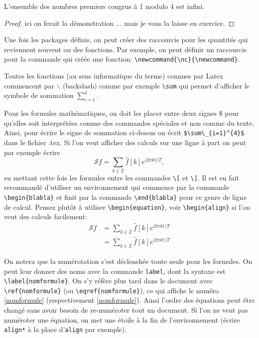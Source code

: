 \begin{theorem}
 L'ensemble des nombres premiers congrus à 1 modulo 4 est infini.
\end{theorem}

\begin{proof}
 ici on ferait la démonstration ... mais  je vous la laisse en exercice.
\end{proof}

Une fois les packages définis, on peut créer des raccourcis pour les quantités qui reviennent 
souvent ou des fonctions. Par exemple, on peut définir un raccourcis pour la commande qui créée une 
fonction: \lstinline+\newcommand{\nc}{\newcommand}+.

\begin{rem}
 Toutes les fonctions (au sens informatique du terme) connues par Latex commencent par $\backslash$ 
(backslash) comme par exemple \lstinline+\sum+
 qui permet d'afficher le symbole de sommation $\sum_{i=1}^{4}$. 
\end{rem}


Pour les formules mathématiques, on doit les placer entre deux signes 
$\$$ pour qu'elles soit interprétées comme des commandes spéciales et non comme du texte. 
Ainsi, pour écrire le signe de sommation ci-dessus on écrit \lstinline+$\sum\_{i=1}^{4}$+ dans le 
fichier .tex. Si l'on veut afficher des calculs sur une ligne à part on peut par exemple écrire 
\[\mathcal{S}f = \sum_{k\in\mathbb{Z}} \hat{f}[k] e^{i2\pi kt/T}, \] 
en mettant cette fois les formules  entre  les commandes 
\lstinline+\[+ et \lstinline+\]+. Il est en fait recommandé d'utiliser un environnement qui commence par la 
commande 
\lstinline+\begin{blabla}+ et finit par la commande \lstinline+\end{blabla}+ pour ce genre de ligne de calcul.
Pensez plut\^ot \`a utiliser \lstinline+\begin{equation}+, voir \lstinline+\begin{align}+ 
si l'on veut des calculs facilement:
\begin{align}
 \mathcal{S}f & = \sum_{k\in\mathbb{Z}} \hat f[k] e^{i2\pi kt/T} \label{nomformule}\\
  & = \sum_{k\in\mathbb{Z}} \hat f[k] e^{i2\pi kt/T}
\end{align}

\begin{rem}
On notera que la numérotation s'est déclenchée toute seule pour les formules. 
On peut  leur donner des noms avec la commande \lstinline+label+,  dont la syntaxe est  \lstinline+\label{nomformule}+.  
On s'y réfère plus tard dans le document avec \lstinline+\ref{nomformule}+ (ou \lstinline+\eqref{nomformule}+), ce qui affiche
le num\'ero \ref{nomformule} (respectivement \eqref{nomformule}). 
Ainsi l'ordre des équations peut être changé sans avoir besoin de re-numéroter tout un document. 
Si l'on ne veut pas numéroter une équation,  on met une étoile à la fin de l'environnement 
(écrire \lstinline+align*+ à la place d'\lstinline+align+ par exemple).
\end{rem}



